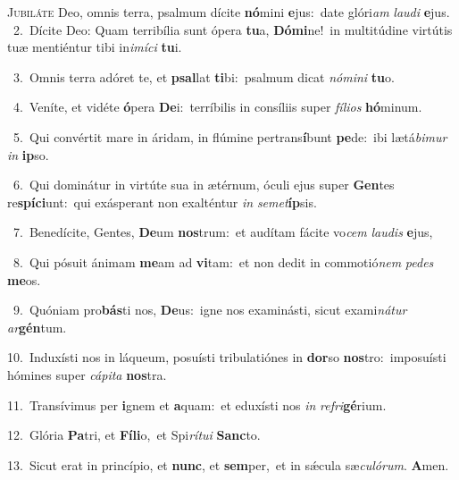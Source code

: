 \lettrine{\initial\textcolor{\initialcolor}{J}}{ubiláte} Deo, omnis terra, psalmum dícite \textbf{nó}\-mini \textbf{e}\-jus:~\star date glóri\textit{am} \textit{lau}\-\textit{di} \textbf{e}\-jus.\\
{\numbfont\textcolor{\numbcolor}{~2.}}~Dícite Deo: Quam terribília sunt ópera \textbf{tu}\-a, \textbf{Dó}\-\textbf{mi}ne!~\star in multitúdine virtútis tuæ mentiéntur tibi in\-\textit{i}\-\textit{mí}\textit{ci} \textbf{tu}\-i.\par
{\numbfont\textcolor{\numbcolor}{~3.}}~Omnis terra adóret te, et \textbf{psal}\-lat \textbf{ti}\-bi:~\star psalmum dicat \textit{nó}\-\textit{mi}\textit{ni} \textbf{tu}\-o.\par
{\numbfont\textcolor{\numbcolor}{~4.}}~Veníte, et vidéte \textbf{ó}\-pera \textbf{De}\-i:~\star terríbilis in consíliis super \textit{fí}\-\textit{li}\textit{os} \textbf{hó}\-minum.\par
{\numbfont\textcolor{\numbcolor}{~5.}}~Qui convértit mare in áridam, in flúmine pertrans\-\textbf{í}\-bunt \textbf{pe}\-de:~\star ibi lætá\-\textit{bi}\-\textit{mur} \textit{in} \textbf{ip}\-so.\par
{\numbfont\textcolor{\numbcolor}{~6.}}~Qui dominátur in virtúte sua in ætérnum, óculi ejus super \textbf{Gen}\-tes re\-\textbf{spí}\-\textbf{ci}unt:~\star qui exásperant non exalténtur \textit{in} \textit{se}\-\textit{met}\textbf{íp}sis.\par
{\numbfont\textcolor{\numbcolor}{~7.}}~Benedícite, Gentes, \textbf{De}\-um \textbf{nos}\-trum:~\star et audítam fácite vo\textit{cem} \textit{lau}\-\textit{dis} \textbf{e}\-jus,\par
{\numbfont\textcolor{\numbcolor}{~8.}}~Qui pósuit ánimam \textbf{me}\-am ad \textbf{vi}\-tam:~\star et non dedit in commotió\textit{nem} \textit{pe}\-\textit{des} \textbf{me}\-os.\par
{\numbfont\textcolor{\numbcolor}{~9.}}~Quóniam pro\-\textbf{bás}\-ti nos, \textbf{De}\-us:~\star igne nos examinásti, sicut exami\-\textit{ná}\-\textit{tur} \textit{ar}\-\textbf{gén}tum.\par
{\numbfont\textcolor{\numbcolor}{10.}}~Induxísti nos in láqueum, posuísti tribulatiónes in \textbf{dor}\-so \textbf{nos}\-tro:~\star imposuísti hómines super \textit{cá}\-\textit{pi}\textit{ta} \textbf{nos}\-tra.\par
{\numbfont\textcolor{\numbcolor}{11.}}~Transívimus per \textbf{i}\-gnem et \textbf{a}\-quam:~\star et eduxísti nos \textit{in} \textit{re}\-\textit{fri}\textbf{gé}rium.\par
{\numbfont\textcolor{\numbcolor}{12.}}~Glória \textbf{Pa}\-tri, et \textbf{Fí}\-\textbf{li}o,~\star et Spi\-\textit{rí}\-\textit{tu}\textit{i} \textbf{Sanc}\-to.\par
{\numbfont\textcolor{\numbcolor}{13.}}~Sicut erat in princípio, et \textbf{nunc}\-, et \textbf{sem}\-per,~\star et in sǽcula sæ\-\textit{cu}\-\textit{ló}\textit{rum}. \textbf{A}\-men.\par
